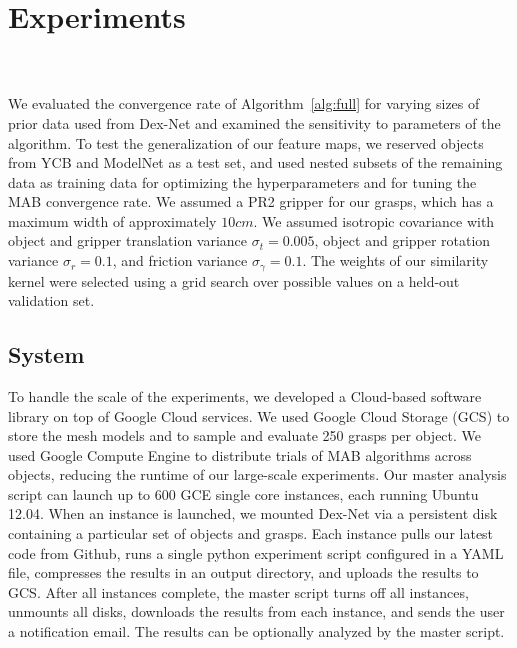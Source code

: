 \section{Experiments}

 \\
 \\

We evaluated the convergence rate of Algorithm~\ref{alg:full} for varying sizes of prior data used from Dex-Net and examined the sensitivity to parameters of the algorithm.
To test the generalization of our feature maps, we reserved objects from YCB and ModelNet as a test set, and used nested subsets of the remaining data as training data for optimizing the hyperparameters and for tuning the MAB convergence rate.
We assumed a PR2 gripper for our grasps, which has a maximum width of approximately $10cm$.
We assumed isotropic covariance with object and gripper translation variance $\sigma_{t} = 0.005$, object and gripper rotation variance $\sigma_{r} = 0.1$, and friction variance $\sigma_{\gamma} = 0.1$.
The weights of our similarity kernel were selected using a grid search over possible values on a held-out validation set.

\subsection{System}
To handle the scale of the experiments, we developed a Cloud-based software library on top of Google Cloud services.
We used Google Cloud Storage (GCS) to store the mesh models and to sample and evaluate 250 grasps per object.
We used Google Compute Engine to distribute trials of MAB algorithms across objects, reducing the runtime of our large-scale experiments.
Our master analysis script can launch up to 600 GCE single core instances, each running Ubuntu 12.04.
When an instance is launched, we mounted Dex-Net via a persistent disk containing a particular set of objects and grasps.
Each instance pulls our latest code from Github, runs a single python experiment script configured in a YAML file, compresses the results in an output directory, and uploads the results to GCS.
After all instances complete, the master script turns off all instances, unmounts all disks, downloads the results from each instance, and sends the user a notification email.
The results can be optionally analyzed by the master script.

